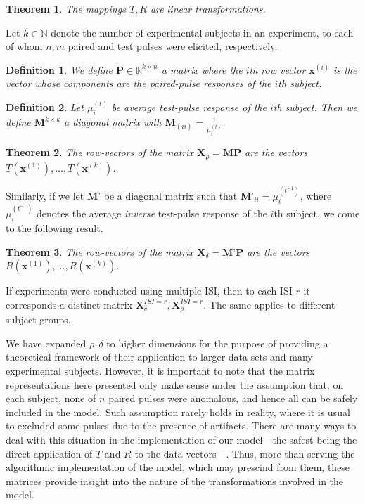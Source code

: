 \documentclass{article}
\newtheorem{definition}{Definition}
\newtheorem{theorem}{Theorem}
\begin{document}
\begin{multicols}{2}
\begin{theorem}
    The mappings $T, R$ are linear transformations.
\end{theorem}

Let $k \in \mathbb{N}$ denote the number of experimental subjects in an
experiment, to each of whom $n, m$ paired and test pulses were elicited,
respectively.

\begin{definition}
    We define $\textbf{P} \in \mathbb{R}^{k \times n}$ a
    matrix where the $i$th row vector $\textbf{x}^{(i)}$ is the vector whose
    components are the paired-pulse responses of the $i$th subject.
\end{definition}

\begin{definition}
    Let $\mu^{(t)}_i$ be average test-pulse response of the $i$th subject. Then
    we define
    $\textbf{M}^{k \times k}$ a diagonal matrix with $\textbf{M}_{(ii)} =
    \frac{1}{\mu^{(t)}_{i}}$.
\end{definition}

\begin{theorem}
    The row-vectors of the matrix $\textbf{X}_\rho = \textbf{M}\textbf{P}$ are the
    vectors $T(\textbf{x}^{(1)}), \ldots, T(\textbf{x}^{(k)})$.
\end{theorem}

Similarly, if we let $\textbf{M'}$ be a diagonal matrix such that
$\textbf{M'}_{ii} = \mu^{(t^{-1})}_i$, where $\mu^{(t^{-1})}_i$ denotes the
average \textit{inverse} test-pulse response of the $i$th subject, we come to
the following result. 

\begin{theorem}
    The row-vectors of the matrix $\textbf{X}_\delta = \textbf{M'}\textbf{P}$ 
    are the vectors $R(\textbf{x}^{(1)}), \ldots,
    R(\textbf{x}^{(k)})$.
\end{theorem}


If experiments were conducted using multiple ISI, then to each ISI $r$ it
corresponds a distinct matrix $\textbf{X}_\delta^{ISI = r},
\textbf{X}_\rho^{ISI = r}$. The same applies to different subject groups.

We have expanded $\rho, \delta$ to higher dimensions for the purpose of
providing a theoretical framework of their application to larger data sets and
many experimental subjects. However, it is important to note that the matrix
representations here presented only make sense under the assumption that, on
each subject, none of $n$ paired pulses were anomalous, and hence all can be
safely included in the model. Such assumption rarely holds in reality, where it
is usual to excluded some pulses due to the presence of artifacts. There are
many ways to deal with this situation in the implementation of our model---the
safest being the direct application of $T$ and $R$ to the data vectors---. Thus,
more than serving the algorithmic implementation of the model, which may
prescind from them, these matrices provide insight into the nature of the
transformations involved in the model.



\end{multicols}
\end{document}
